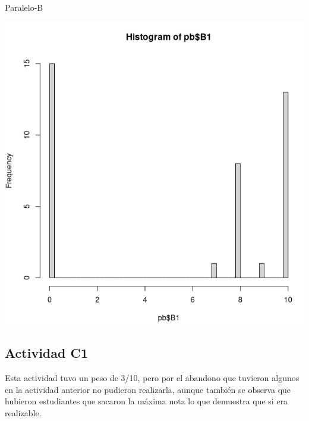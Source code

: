 \documentclass[a4pa<per,12pt,spanish]{article}
\begin{document}
\begin{minipage}[h]{0.45\linewidth}
Paralelo-B

\includegraphics[scale=0.3]{images/histo-PB-B1.png}
\end{minipage}



\subsection{Actividad C1}
\label{sec:acctiviidad-c1}
Esta actividad tuvo un peso de 3/10, pero por el abandono que tuvieron algunos en la actividad anterior no pudieron realizarla, aunque también se observa que hubieron estudiantes que sacaron la máxima nota lo que demuestra que si era realizable.\\
\end{document}
